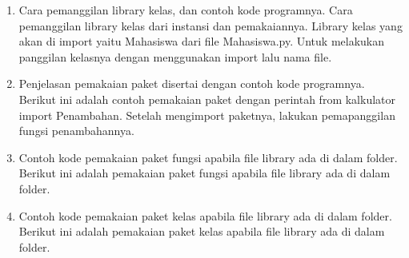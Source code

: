 \begin{enumerate}
\item{Cara pemanggilan library kelas, dan contoh kode programnya.}
    Cara pemanggilan library kelas dari instansi dan pemakaiannya. Library kelas yang akan di import yaitu Mahasiswa dari file Mahasiswa.py. Untuk melakukan panggilan kelasnya dengan menggunakan import lalu nama file.
    	

\item{Penjelasan pemakaian paket disertai dengan contoh kode programnya.}
	Berikut ini adalah contoh pemakaian paket dengan perintah from kalkulator import Penambahan. Setelah mengimport paketnya, lakukan pemapanggilan fungsi penambahannya.
		

\item{Contoh kode pemakaian paket fungsi apabila file library ada di dalam folder.}
    Berikut ini adalah pemakaian paket fungsi apabila file library ada di dalam folder.
    	
\newpage

\item{Contoh kode pemakaian paket kelas apabila file library ada di dalam folder.}
    Berikut ini adalah pemakaian paket kelas apabila file library ada di dalam folder.
    
\end{enumerate}

